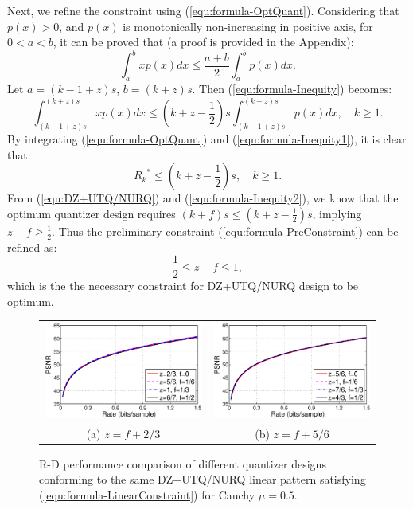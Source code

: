 \documentclass[smallabstract,smallcaptions]{dccpaper}
\begin{document}
Next, we refine the constraint using (\ref{equ:formula-OptQuant}). Considering that $p(x) > 0$, and $p(x)$ is monotonically non-increasing in positive axis, for $0 < a < b$, it can be proved that (a proof is provided in the Appendix):
\begin{equation}\label{equ:formula-Inequity}
	\int_a^b xp(x)dx \le \frac{a+b}{2} \int_a^b p(x)dx.
\end{equation}
Let $a=(k-1+z)s$, $b=(k+z)s$. Then (\ref{equ:formula-Inequity}) becomes:
\begin{equation}\label{equ:formula-Inequity1}
	\int_{(k-1+z)s}^{(k+z)s} xp(x)dx \le (k+z-\frac{1}{2}) s \int_{(k-1+z)s}^{(k+z)s} p(x)dx, \quad k \ge 1.
\end{equation}
By integrating (\ref{equ:formula-OptQuant}) and (\ref{equ:formula-Inequity1}), it is clear that:
\begin{equation}\label{equ:formula-Inequity2}
	{R_k}^* \le (k+z-\frac{1}{2})s, \quad k \ge 1.
\end{equation}
From (\ref{equ:DZ+UTQ/NURQ}) and (\ref{equ:formula-Inequity2}), we know that the optimum quantizer design requires $(k+f)s \le (k+z-\frac{1}{2})s$, implying $z-f \ge \frac{1}{2}$. Thus the preliminary constraint (\ref{equ:formula-PreConstraint}) can be refined as:
\begin{equation}\label{equ:formula-RefConstraint}
	\frac{1}{2} \le z - f \le 1,
\end{equation}
which is the the necessary constraint for DZ+UTQ/NURQ design to be optimum.

\begin{figure}
\begin{center}
\begin{tabular}{cc}
\includegraphics[width = 0.5\linewidth]{Figures/section4/RD_Cauchy_mu=0_5_z=p+0_67} &
\includegraphics[width = 0.5\linewidth]{Figures/section4/RD_Cauchy_mu=0_5_z=p+0_83} \\
{\small (a) $z=f+2/3$} & {\small (b) $z=f+5/6$} 
\end{tabular}
\end{center}
\vspace{-20pt}
\caption{\label{fig:RD_same_pattern}
R-D performance comparison of different quantizer designs conforming to the same DZ+UTQ/NURQ linear pattern satisfying (\ref{equ:formula-LinearConstraint}) for Cauchy $\mu=0.5$.}
\end{figure}
\end{document}
